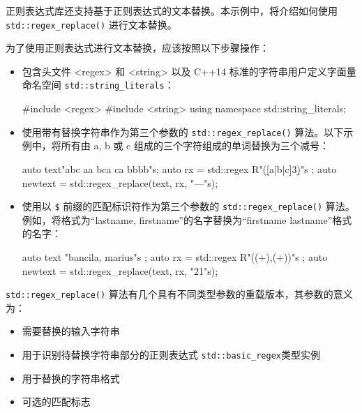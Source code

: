 

正则表达式库还支持基于正则表达式的文本替换。本示例中，将介绍如何使用 \verb|std::regex_replace()| 进行文本替换。


为了使用正则表达式进行文本替换，应该按照以下步骤操作：

\begin{itemize}
\item
包含头文件 <regex> 和 <string> 以及 C++14 标准的字符串用户定义字面量命名空间 \verb|std::string_literals|：

\begin{cpp}
#include <regex>
#include <string>
using namespace std::string_literals;
\end{cpp}

\item
使用带有替换字符串作为第三个参数的 \verb|std::regex_replace()| 算法。以下示例中，将所有由 a, b 或 c 组成的三个字符组成的单词替换为三个减号：

\begin{cpp}
auto text{"abc aa bca ca bbbb"s};
auto rx = std::regex{ R"(\b[a|b|c]{3}\b)"s };
auto newtext = std::regex_replace(text, rx, "---"s);
\end{cpp}

\item
使用以 \verb|$| 前缀的匹配标识符作为第三个参数的 \verb|std::regex_replace()| 算法。例如，将格式为“lastname, firstname”的名字替换为“firstname lastname”格式的名字：

\begin{cpp}
auto text{ "bancila, marius"s };
auto rx = std::regex{ R"((\w+),\s*(\w+))"s };
auto newtext = std::regex_replace(text, rx, "$2 $1"s);
\end{cpp}
\end{itemize}


\verb|std::regex_replace()| 算法有几个具有不同类型参数的重载版本，其参数的意义为：

\begin{itemize}
\item
需要替换的输入字符串

\item
用于识别待替换字符串部分的正则表达式 \verb|std::basic_regex|类型实例

\item
用于替换的字符串格式

\item
可选的匹配标志
\end{itemize}

